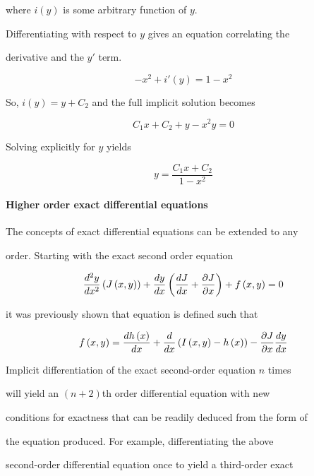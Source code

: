 where $i\left(y\right)$ is some arbitrary function of $y$.

Differentiating with respect to $y$ gives an equation correlating the

derivative and the $y'$ term.



$$-x^2+i'\left(y\right)=1-x^2$$



So, $i\left(y\right)=y+C_2$ and the full implicit solution becomes



$$C_1x+C_2+y-x^2y=0$$



Solving explicitly for $y$ yields



$$y= \frac{C_1x+C_2}{1-x^2}$$



\paragraph{Higher order exact differential equations}



The concepts of exact differential equations can be extended to any

order. Starting with the exact second order equation



$${d^2y \over dx^2}\left(J\left(x,y\right)\right)+{dy \over dx}\left({dJ \over dx}+{\partial J\over\partial x}\right)+f\left(x,y\right)=0$$



it was previously shown that equation is defined such that



$$f\left(x,y\right)={dh\left(x\right) \over dx}+{d \over dx}\left(I\left(x,y\right)-h\left(x\right)\right)-{\partial J\over\partial x}{dy \over dx}$$



Implicit differentiation of the exact second-order equation $n$ times

will yield an $\left(n+2\right)$th order differential equation with new

conditions for exactness that can be readily deduced from the form of

the equation produced. For example, differentiating the above

second-order differential equation once to yield a third-order exact

